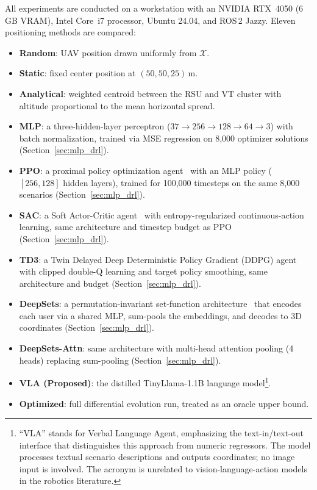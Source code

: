 \documentclass[journal]{IEEEtran}
\begin{document}
All experiments are conducted on a workstation with an NVIDIA RTX~4050 (6\,GB VRAM), Intel Core~i7 processor, Ubuntu 24.04, and ROS\,2 Jazzy. Eleven positioning methods are compared:

\begin{itemize}
    \item \textbf{Random}: UAV position drawn uniformly from $\mathcal{X}$.
    \item \textbf{Static}: fixed center position at $(50, 50, 25)$\,m.
    \item \textbf{Analytical}: weighted centroid between the RSU and VT cluster with altitude proportional to the mean horizontal spread.
    \item \textbf{MLP}: a three-hidden-layer perceptron ($37 \to 256 \to 128 \to 64 \to 3$) with batch normalization, trained via MSE regression on 8{,}000 optimizer solutions (Section~\ref{sec:mlp_drl}).
    \item \textbf{PPO}: a proximal policy optimization agent~\cite{schulman2017ppo} with an MLP policy ($[256, 128]$ hidden layers), trained for 100{,}000 timesteps on the same 8{,}000 scenarios (Section~\ref{sec:mlp_drl}).
    \item \textbf{SAC}: a Soft Actor-Critic agent~\cite{haarnoja2018sac} with entropy-regularized continuous-action learning, same architecture and timestep budget as PPO (Section~\ref{sec:mlp_drl}).
    \item \textbf{TD3}: a Twin Delayed Deep Deterministic Policy Gradient (DDPG) agent with clipped double-Q learning and target policy smoothing, same architecture and budget (Section~\ref{sec:mlp_drl}).
    \item \textbf{DeepSets}: a permutation-invariant set-function architecture~\cite{zaheer2017deepsets} that encodes each user via a shared MLP, sum-pools the embeddings, and decodes to 3D coordinates (Section~\ref{sec:mlp_drl}).
    \item \textbf{DeepSets-Attn}: same architecture with multi-head attention pooling (4 heads) replacing sum-pooling (Section~\ref{sec:mlp_drl}).
    \item \textbf{VLA (Proposed)}: the distilled TinyLlama-1.1B language model\footnote{``VLA'' stands for Verbal Language Agent, emphasizing the text-in/text-out interface that distinguishes this approach from numeric regressors. The model processes textual scenario descriptions and outputs coordinates; no image input is involved. The acronym is unrelated to vision-language-action models in the robotics literature.}.
    \item \textbf{Optimized}: full differential evolution run, treated as an oracle upper bound.
\end{itemize}
\end{document}
